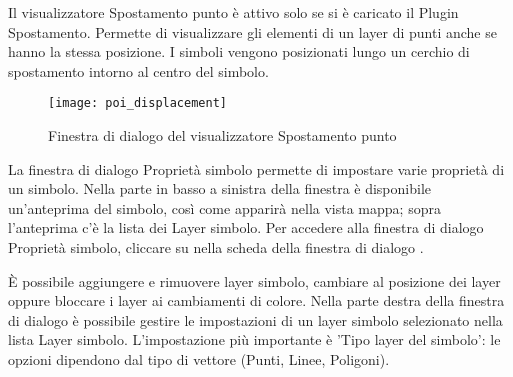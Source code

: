 
Il visualizzatore Spostamento punto è attivo solo se si è caricato il Plugin Spostamento. 
Permette di visualizzare gli elementi di un layer di punti anche se hanno la stessa posizione.
I simboli vengono posizionati lungo un cerchio di spostamento intorno al centro del simbolo. 

\begin{figure}[ht]
   \centering
   \texttt{[image: poi\_displacement]}
   \caption{Finestra di dialogo del visualizzatore Spostamento punto \wincaption}\label{fig:poidissymNG}
\end{figure}


La finestra di dialogo Proprietà simbolo permette di impostare varie proprietà di un simbolo. 
Nella parte in basso a sinistra della finestra è disponibile un'anteprima del simbolo, così come 
apparirà nella vista mappa; sopra l'anteprima c'è la lista dei Layer simbolo. Per accedere alla 
finestra di dialogo Proprietà simbolo, cliccare su  
nella scheda  della finestra di dialogo .

È possibile aggiungere e rimuovere layer simbolo, cambiare al posizione dei layer oppure 
bloccare i layer ai cambiamenti di colore. Nella parte destra della finestra di dialogo è
possibile gestire le impostazioni di un layer simbolo selezionato nella lista Layer simbolo. 
L'impostazione più importante è 'Tipo layer del simbolo': le opzioni dipendono dal tipo 
di vettore (Punti, Linee, Poligoni).
  
